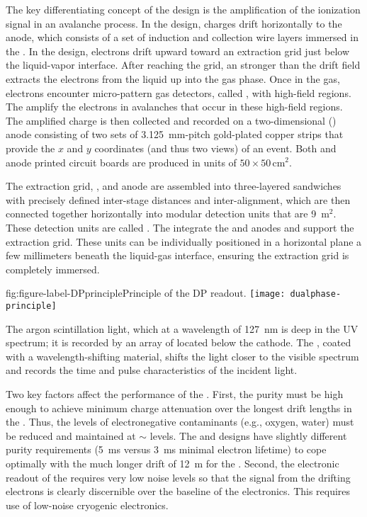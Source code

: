 The key differentiating concept of the  design is the amplification of the ionization signal in an avalanche process. In the  design, charges drift horizontally to the anode, which consists of a set of induction and collection wire layers immersed in the . In the  design, electrons drift upward toward an extraction grid just below the liquid-vapor interface. After reaching the grid, an \efield stronger than the drift field extracts the electrons from the liquid up into the gas phase. Once in the gas, electrons encounter micro-pattern gas detectors, called , with high-field regions. The  amplify the electrons in avalanches that occur in these high-field regions. The amplified charge is then collected and recorded on a two-dimensional (\twod) anode consisting of two sets of \SI{3.125}{mm}-pitch gold-plated copper strips that provide the $x$ and $y$ coordinates (and thus two views) of an event. Both  and anode printed circuit boards are produced in units of $50 \times 50\, $cm$^2$. 

The extraction grid, , and anode are assembled into three-layered sandwiches with precisely defined inter-stage distances and inter-alignment,  which are then connected together horizontally into modular detection units that are \num{9}~m$^2$. These detection units are called . The  integrate the  and anodes and support the extraction grid. These units can be individually positioned in a horizontal plane a few millimeters beneath the liquid-gas interface, ensuring the extraction grid is completely immersed. 

\begin{dunefigure}{fig:figure-label-DPprinciple}{Principle of the DP readout.}
\texttt{[image: dualphase-principle]}
\end{dunefigure}

The argon scintillation light, which at a wavelength of  \SI{127}{nm} is deep in the UV spectrum; it is recorded by an array of  located below the cathode.  The , coated with a wavelength-shifting material, shifts the light  closer to the visible spectrum and records the time and pulse characteristics of the incident light.

Two key factors affect the performance of the .  First, the  purity must be high enough to achieve minimum charge attenuation over the longest drift lengths in the .  Thus, the levels of electronegative contaminants (e.g., oxygen, water) must be reduced and
maintained at $\sim$  levels.  The  and  designs have slightly different purity requirements (\SI{5}{ms} versus \SI{3}{ms} minimal electron lifetime) to  cope optimally with the much longer drift of \SI{12}{m} for the . 
Second, the electronic readout of the  requires very low noise levels so that the signal from the drifting electrons is clearly discernible over the baseline of the electronics.  This requires use of low-noise cryogenic electronics. 

